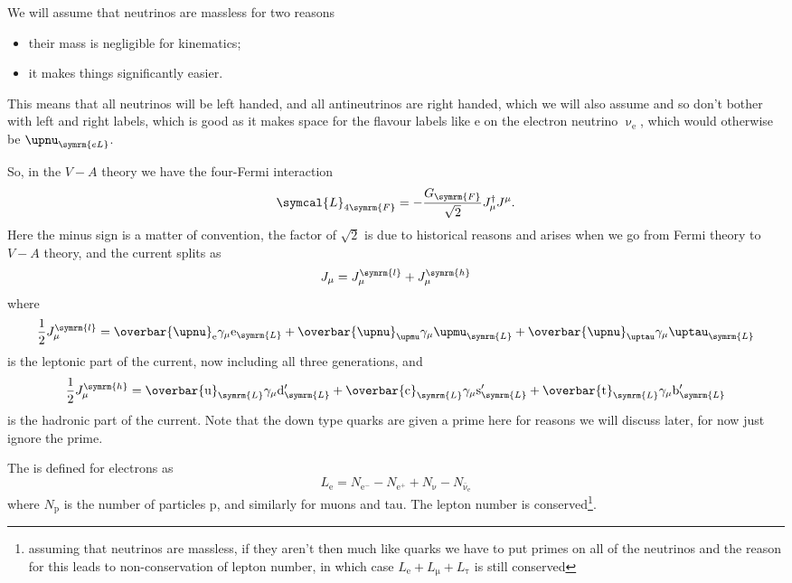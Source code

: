 \documentclass[fleqn]{NotesClass}
\newcommand{\Pparticle}[1]{\mathrm{#1}}
\newcommand{\Pu}{\ensuremath{\Pparticle{u}}}
\newcommand{\Pd}{\ensuremath{\Pparticle{d}}}
\newcommand{\Ps}{\ensuremath{\Pparticle{s}}}
\newcommand{\Pc}{\ensuremath{\Pparticle{c}}}
\newcommand{\Pt}{\ensuremath{\Pparticle{t}}}
\newcommand{\Pb}{\ensuremath{\Pparticle{b}}}
\newcommand{\Pe}{\ensuremath{\Pparticle{e}^{-}}}
\newcommand{\Pex}{\ensuremath{\Pparticle{e}}}
\newcommand{\Pmux}{\ensuremath{\upmu}}
\newcommand{\Ptaux}{\ensuremath{\uptau}}
\newcommand{\Pnu}{\ensuremath{\upnu}}
\newcommand{\Pnue}{\ensuremath{\upnu_{\mathrm{e}}}}
\newcommand{\PnueLeft}{\ensuremath{\upnu_{\symrm{eL}}}}
\newcommand{\Pp}{\ensuremath{\Pparticle{p}}}
\newcommand{\APantiparticle}[1]{\bar{#1}}
\newcommand{\APe}{\ensuremath{\Pparticle{e}^{+}}}
\newcommand{\APnue}{\ensuremath{\APantiparticle{\upnu}_{\mathrm{e}}}}
\newcommand{\diracadjoint}[1]{\overbar{#1}}
\newcommand{\hermit}{\dagger}
\newcommand{\lagrangianDensity}{\symcal{L}}
\newcommand{\Left}{\symrm{L}}
\newcommand{\fermiConst}{G_{\symrm{F}}}
\begin{document}
    We will assume that neutrinos are massless for two reasons
    \begin{itemize}
        \item their mass is negligible for kinematics;
        \item it makes things significantly easier.
    \end{itemize}
    This means that all neutrinos will be left handed, and all antineutrinos are right handed, which we will also assume and so don't bother with left and right labels, which is good as it makes space for the flavour labels like \(\Pex\) on the electron neutrino \(\Pnue\), which would otherwise be \(\PnueLeft\).
    
    So, in the \(V - A\) theory we have the four-Fermi interaction
    \begin{equation}
        \lagrangianDensity_{4\symrm{F}} = -\frac{\fermiConst}{\sqrt{2}} J_\mu^\hermit J^\mu.
    \end{equation}
    Here the minus sign is a matter of convention, the factor of \(\sqrt{2}\) is due to historical reasons and arises when we go from Fermi theory to \(V - A\) theory, and the current splits as
    \begin{equation}
        J_\mu = J_\mu^{\symrm{l}} + J_\mu^{\symrm{h}}
    \end{equation}
    where
    \begin{equation}
        \frac{1}{2}J_\mu^{\symrm{l}} = \diracadjoint{\Pnu}_{\Pex} \gamma_\mu \Pex_{\Left} + \diracadjoint{\Pnu}_{\Pmux} \gamma_\mu \Pmux_{\Left} + \diracadjoint{\Pnu}_{\Ptaux} \gamma_\mu \Ptaux_{\Left}
    \end{equation}
    is the leptonic part of the current, now including all three generations, and
    \begin{equation}
        \frac{1}{2}J_\mu^{\symrm{h}} = \diracadjoint{\Pu}_{\Left} \gamma_\mu \Pd'_{\Left} + \diracadjoint{\Pc}_{\Left} \gamma_\mu \Ps'_{\Left} + \diracadjoint{\Pt}_{\Left} \gamma_\mu \Pb'_{\Left}
    \end{equation}
    is the hadronic part of the current.
    Note that the down type quarks are given a prime here for reasons we will discuss later, for now just ignore the prime.
    
    The  is defined for electrons as
    \begin{equation}
        L_{\Pex} = N_{\Pe} - N_{\APe} + N_{\Pnu} - N_{\APnue}
    \end{equation}
    where \(N_{\Pp}\) is the number of particles \(\Pp\), and similarly for muons and tau.
    The lepton number is conserved\footnote{assuming that neutrinos are massless, if they aren't then much like quarks we have to put primes on all of the neutrinos and the reason for this leads to non-conservation of lepton number, in which case \(L_{\Pex} + L_{\Pmux} + L_{\Ptaux}\) is still conserved}.
    
\end{document}
